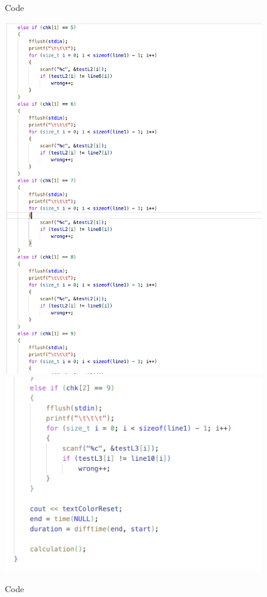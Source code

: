 \begin{figure}[h]
    \caption{Code}
    \label{fig:code-screenshots}
\end{figure}
\newpage
\begin{figure}[h]
     \includegraphics[scale=0.16]{CodeScreenShot/speedtest-9.png}
     \includegraphics[scale=0.16]{CodeScreenShot/speedtest-10.png}
    \caption{Code}
    \label{fig:code-screenshots}
\end{figure}
